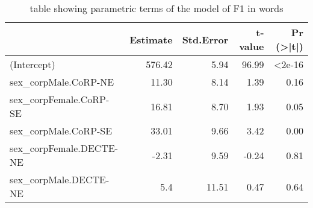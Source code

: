 \documentclass[../../../00.FullDoc/tex/Thesis]{subfiles}
\begin{document}
\begin{table}[htbp]
	\centering
	\begin{tabular}{lrrrr}
		\hline
		& Estimate & Std.Error & t-value & Pr (>|t|) \\
		\hline
		(Intercept) & 576.42 & 5.94 & 96.99 & <2e-16 \\
		sex\_corpMale.CoRP-NE & 11.30 & 8.14 & 1.39 & 0.16 \\
		sex\_corpFemale.CoRP-SE & 16.81 & 8.70 & 1.93 & 0.05 \\
		sex\_corpMale.CoRP-SE & 33.01 & 9.66 & 3.42 & 0.00 \\
		sex\_corpFemale.DECTE-NE & -2.31 & 9.59 & -0.24 & 0.81 \\
		sex\_corpMale.DECTE-NE & 5.4 & 11.51 & 0.47 & 0.64 \\
		\hline
	\end{tabular}%
	\caption{table showing parametric terms of the model of F1 in \hope{} words}
	\label{tbl:hopeF1-para}%
\end{table}%
\end{document}
